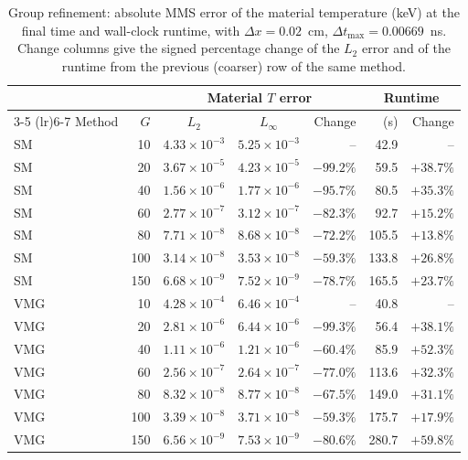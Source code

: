 \begin{table}[htbp]
  \centering
  \caption{Group refinement: absolute MMS error of the material temperature (keV) at the final time and wall-clock runtime, with $\Delta x = 0.02$~cm, $\Delta t_{\max} = 0.00669$~ns. Change columns give the signed percentage change of the $L_2$ error and of the runtime from the previous (coarser) row of the same method.}
  \label{tab:mms-error-groups}
  \begin{tabular}{lr ccr rr}
    \toprule
    & & \multicolumn{3}{c}{Material $T$ error} & \multicolumn{2}{c}{Runtime} \\
    \cmidrule(lr){3-5} \cmidrule(lr){6-7}
    Method & $G$ & $L_2$ & $L_\infty$ & Change & (s) & Change \\
    \midrule
    SM & 10 & $4.33\times10^{-3}$ & $5.25\times10^{-3}$ & -- & 42.9 & -- \\
    SM & 20 & $3.67\times10^{-5}$ & $4.23\times10^{-5}$ & $-99.2\%$ & 59.5 & $+38.7\%$ \\
    SM & 40 & $1.56\times10^{-6}$ & $1.77\times10^{-6}$ & $-95.7\%$ & 80.5 & $+35.3\%$ \\
    SM & 60 & $2.77\times10^{-7}$ & $3.12\times10^{-7}$ & $-82.3\%$ & 92.7 & $+15.2\%$ \\
    SM & 80 & $7.71\times10^{-8}$ & $8.68\times10^{-8}$ & $-72.2\%$ & 105.5 & $+13.8\%$ \\
    SM & 100 & $3.14\times10^{-8}$ & $3.53\times10^{-8}$ & $-59.3\%$ & 133.8 & $+26.8\%$ \\
    SM & 150 & $6.68\times10^{-9}$ & $7.52\times10^{-9}$ & $-78.7\%$ & 165.5 & $+23.7\%$ \\
    \addlinespace
    VMG & 10 & $4.28\times10^{-4}$ & $6.46\times10^{-4}$ & -- & 40.8 & -- \\
    VMG & 20 & $2.81\times10^{-6}$ & $6.44\times10^{-6}$ & $-99.3\%$ & 56.4 & $+38.1\%$ \\
    VMG & 40 & $1.11\times10^{-6}$ & $1.21\times10^{-6}$ & $-60.4\%$ & 85.9 & $+52.3\%$ \\
    VMG & 60 & $2.56\times10^{-7}$ & $2.64\times10^{-7}$ & $-77.0\%$ & 113.6 & $+32.3\%$ \\
    VMG & 80 & $8.32\times10^{-8}$ & $8.77\times10^{-8}$ & $-67.5\%$ & 149.0 & $+31.1\%$ \\
    VMG & 100 & $3.39\times10^{-8}$ & $3.71\times10^{-8}$ & $-59.3\%$ & 175.7 & $+17.9\%$ \\
    VMG & 150 & $6.56\times10^{-9}$ & $7.53\times10^{-9}$ & $-80.6\%$ & 280.7 & $+59.8\%$ \\
    \bottomrule
  \end{tabular}
\end{table}
